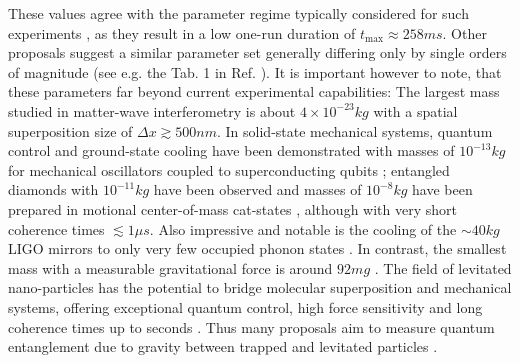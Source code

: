 These values agree with the parameter regime typically considered for such experiments \cite[Timestamp: 51:00]{Aspelmeyer_2024}, as they result in a low one-run duration of $t_\mathrm{max}\approx 258\si{ms}$.
Other proposals suggest a similar parameter set generally differing only by single orders of magnitude (see e.g. the Tab. 1 in Ref. \cite{Rijavec_2021}).
It is important however to note, that these parameters far beyond current experimental capabilities:
The largest mass studied in matter-wave interferometry is about $4\times 10^{-23}\si{kg}$ \cite{Fein_2019} with a spatial superposition size of $\Delta x \gtrsim 500\si{nm}$.
In solid-state mechanical systems, quantum control and ground-state cooling have been demonstrated with masses of $10^{-13}\si{kg}$ for mechanical oscillators coupled to superconducting qubits \cite{OConnell_2010}; entangled diamonds with $10^{-11}\si{kg}$ have been observed \cite{Lee_2011} and masses of $10^{-8}\si{kg}$ have been prepared in motional center-of-mass cat-states \cite{Bild_2023}, although with very short coherence times $\lesssim 1\si{\mu s}$.
Also impressive and notable is the cooling of the $\sim 40\si{kg}$ LIGO mirrors to only very few occupied phonon states \cite{Whittle_2021}.
In contrast, the smallest mass with a measurable gravitational force is around $92 \si{mg}$ \cite{Westphal_2021}.
The field of levitated nano-particles has the potential to bridge molecular superposition and mechanical systems, offering exceptional quantum control, high force sensitivity and long coherence times up to seconds \cite{Aspelmeyer_2024}.
Thus many proposals aim to measure quantum entanglement due to gravity between trapped and levitated particles \cite{Krisnanda_2020,GonzalezBallestero_2021}.

